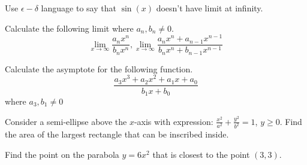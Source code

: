 \documentclass[Calculus 1 Recitation.tex]{subfiles}
\begin{document}
\begin{myleftlinebox}
	Use $\epsilon-\delta$ language to say that $\sin(x)$ doesn't have limit at infinity.
	\tcblower
	\vspace{2em}
\end{myleftlinebox}

\begin{myleftlinebox}
	Calculate the following limit where $a_n,b_n\neq 0$.
	\[\lim_{x\to\infty}\frac{a_n x^n}{b_n x^n}, \lim_{x\to\infty}\frac{a_n x^n+a_{n-1} x^{n-1}}{b_n x^n+b_{n-1} x^{n-1}}\]
	\tcblower
	\vspace{2em}
\end{myleftlinebox}

\begin{myleftlinebox}
	Calculate the asymptote for the following function.
	\[\frac{a_3 x^3+a_2 x^2+a_1 x+a_0}{b_1 x+b_0}\]
	where $a_3,b_1\neq0$
	\tcblower
	\vspace{2em}
\end{myleftlinebox}

\begin{myleftlinebox}
	Consider a semi-ellipse above the $x$-axis with expression: $\frac{x^2}{a^2}+\frac{y^2}{b^2}=1$, $y\geq 0$. Find the area of the largest rectangle that can be inscribed inside.
	\tcblower
	\vspace{2em}
\end{myleftlinebox}

\begin{myleftlinebox}
	Find the point on the parabola $y=6x^2$ that is closest to the point $(3,3)$.
	\tcblower
	\vspace{2em}
\end{myleftlinebox}
\end{document}

